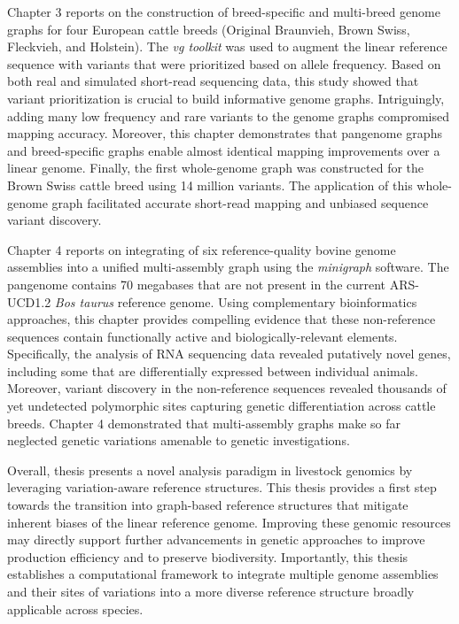 \documentclass[11 pt, a4paper, notitlepage]{report}
\begin{document}
Chapter 3 reports on the construction of breed-specific and multi-breed genome graphs for four European cattle breeds (Original Braunvieh, Brown Swiss, Fleckvieh, and Holstein).  The \emph{vg toolkit} was used to augment the linear reference sequence with variants that were prioritized based on allele frequency. Based on both real and simulated short-read sequencing data, this study showed that variant prioritization is crucial to build informative genome graphs. Intriguingly, adding many low frequency and rare variants to the genome graphs compromised mapping accuracy. Moreover, this chapter demonstrates that pangenome graphs and breed-specific graphs enable almost identical mapping improvements over a linear genome. Finally, the first whole-genome graph was constructed for the Brown Swiss cattle breed using 14 million variants. The application of this whole-genome graph facilitated accurate short-read mapping and unbiased sequence variant discovery. 

\thispagestyle{plain}

Chapter 4 reports on integrating of six reference-quality bovine genome assemblies into a unified multi-assembly graph using the \emph{minigraph} software. The pangenome contains 70 megabases that are not present in the current ARS-UCD1.2 \emph{Bos taurus} reference genome.  Using complementary bioinformatics approaches, this chapter provides compelling evidence that these non-reference sequences contain functionally active and biologically-relevant elements. Specifically, the analysis of RNA sequencing data revealed putatively novel genes, including some that are differentially expressed between individual animals. Moreover, variant discovery in the non-reference sequences revealed thousands of yet undetected polymorphic sites capturing genetic differentiation across cattle breeds. Chapter 4 demonstrated that multi-assembly graphs make so far neglected genetic variations amenable to genetic investigations. 

Overall, thesis presents a novel analysis paradigm in livestock genomics by leveraging variation-aware reference structures. This thesis provides a first step towards the transition into graph-based reference structures that mitigate inherent biases of the linear reference genome. Improving these genomic resources may directly support further advancements in genetic approaches to improve production efficiency and to preserve biodiversity. Importantly, this thesis establishes a computational framework to integrate multiple genome assemblies and their sites of variations into a more diverse reference structure broadly applicable across species. 
\end{document}
